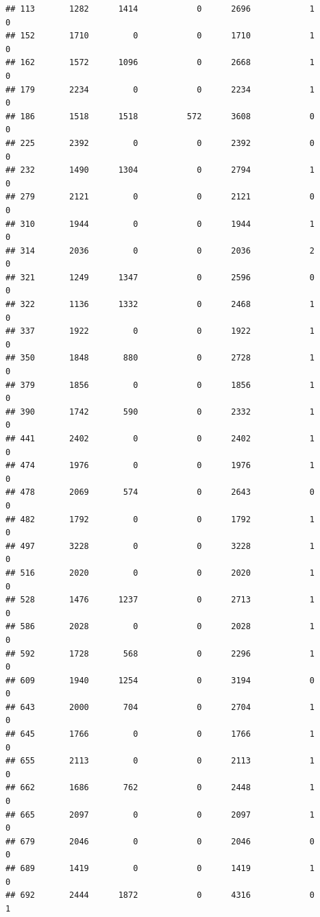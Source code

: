 \documentclass[]{article}
\begin{document}
\begin{verbatim}
## 113       1282      1414            0      2696            1            0
## 152       1710         0            0      1710            1            0
## 162       1572      1096            0      2668            1            0
## 179       2234         0            0      2234            1            0
## 186       1518      1518          572      3608            0            0
## 225       2392         0            0      2392            0            0
## 232       1490      1304            0      2794            1            0
## 279       2121         0            0      2121            0            0
## 310       1944         0            0      1944            1            0
## 314       2036         0            0      2036            2            0
## 321       1249      1347            0      2596            0            0
## 322       1136      1332            0      2468            1            0
## 337       1922         0            0      1922            1            0
## 350       1848       880            0      2728            1            0
## 379       1856         0            0      1856            1            0
## 390       1742       590            0      2332            1            0
## 441       2402         0            0      2402            1            0
## 474       1976         0            0      1976            1            0
## 478       2069       574            0      2643            0            0
## 482       1792         0            0      1792            1            0
## 497       3228         0            0      3228            1            0
## 516       2020         0            0      2020            1            0
## 528       1476      1237            0      2713            1            0
## 586       2028         0            0      2028            1            0
## 592       1728       568            0      2296            1            0
## 609       1940      1254            0      3194            0            0
## 643       2000       704            0      2704            1            0
## 645       1766         0            0      1766            1            0
## 655       2113         0            0      2113            1            0
## 662       1686       762            0      2448            1            0
## 665       2097         0            0      2097            1            0
## 679       2046         0            0      2046            0            0
## 689       1419         0            0      1419            1            0
## 692       2444      1872            0      4316            0            1

\end{verbatim}
\end{document}
